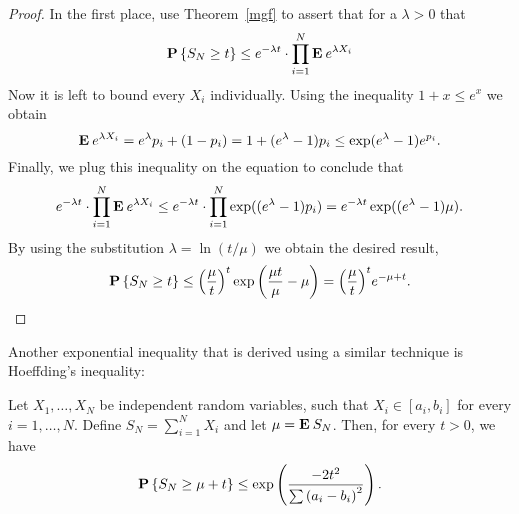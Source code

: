 \begin{proof}
  In the first place, use Theorem~\ref{mgf} to assert that for a $\lambda > 0$ that
  \[\P\left\{  S_N \geq t\right\} \leq e^{-\lambda t}\cdot \prod_{i = 1}^N \E e^{\lambda X_i} \] 
  Now it is left to bound every $X_i$ individually. Using the inequality $1+x \leq e^x$ we obtain
  \[ \E e^{\lambda X_i} = e^{\lambda}p_i + (1-p_i) = 1 + (e^{\lambda}-1)p_i  \leq \exp(e^{\lambda}-1)e^{p_i}.\]
  Finally, we plug this inequality on the equation to conclude that
  \[e^{-\lambda t}\cdot \prod_{i = 1}^N \E e^{\lambda X_i} \leq e^{-\lambda t}\cdot \prod_{i = 1}^N \exp((e^{\lambda}-1) p_i) = e^{-\lambda t} \exp((e^{\lambda}-1) \mu). \]
  By using the substitution $\lambda = \ln (t/\mu)$ we obtain the desired result,
  \[ \P\left\{  S_N \geq t\right\} \leq {\left(\frac{\mu}{t}\right)}^t \exp{\left(\frac{\mu t}{\mu}-\mu\right)} = {\left(\frac{\mu}{t}\right)}^t e^{-\mu+t}. \]
\end{proof}

Another exponential inequality that is derived using a similar technique is Hoeffding's inequality:

\begin{theorem}\label{hoeffding:bounded}
  Let $X_1, \ldots, X_N$ be independent random variables, such that $X_i \in [a_i,b_i]$ for every $i = 1,\ldots,N$. Define $S_N = \sum_{i = 1}^{N} X_i$ and let $\mu = \E S_N$. Then, for every $t > 0$, we have
  \[ \P\left\{  S_N \geq \mu + t\right\} \leq \exp\left( \frac{-2t^2}{\sum{( a_i - b_i )}^2}\right). \]
\end{theorem}

